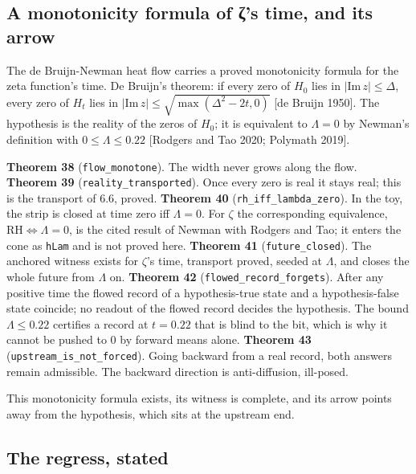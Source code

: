 \documentclass[10pt,twocolumn]{article}
\begin{document}
\hypertarget{a-monotonicity-formula-of-ux3b6s-time-and-its-arrow}{%
\subsection{A monotonicity formula of ζ's time, and its
arrow}\label{a-monotonicity-formula-of-ux3b6s-time-and-its-arrow}}

The de Bruijn-Newman heat flow carries a proved monotonicity formula for
the zeta function's time. De Bruijn's theorem: if every zero of \(H_0\)
lies in \(|\mathrm{Im}\, z| \leq \Delta\), every zero of \(H_t\) lies in
\(|\mathrm{Im}\, z| \leq \sqrt{\max(\Delta^2 - 2t, 0)}\) {[}de Bruijn
1950{]}. The hypothesis is the reality of the zeros of \(H_0\); it is
equivalent to \(\Lambda = 0\) by Newman's definition with
\(0 \leq \Lambda \leq 0.22\) {[}Rodgers and Tao 2020; Polymath 2019{]}.

\textbf{Theorem 38} (\texttt{flow\_monotone}). The width never grows
along the flow. \textbf{Theorem 39} (\texttt{reality\_transported}).
Once every zero is real it stays real; this is the transport of 6.6,
proved. \textbf{Theorem 40} (\texttt{rh\_iff\_lambda\_zero}). In the
toy, the strip is closed at time zero iff \(\Lambda = 0\). For \(\zeta\)
the corresponding equivalence, \(\mathrm{RH} \iff \Lambda = 0\), is the
cited result of Newman with Rodgers and Tao; it enters the cone as
\texttt{hLam} and is not proved here. \textbf{Theorem 41}
(\texttt{future\_closed}). The anchored witness exists for \(\zeta\)'s
time, transport proved, seeded at \(\Lambda\), and closes the whole
future from \(\Lambda\) on. \textbf{Theorem 42}
(\texttt{flowed\_record\_forgets}). After any positive time the flowed
record of a hypothesis-true state and a hypothesis-false state coincide;
no readout of the flowed record decides the hypothesis. The bound
\(\Lambda \leq 0.22\) certifies a record at \(t = 0.22\) that is blind
to the bit, which is why it cannot be pushed to \(0\) by forward means
alone. \textbf{Theorem 43} (\texttt{upstream\_is\_not\_forced}). Going
backward from a real record, both answers remain admissible. The
backward direction is anti-diffusion, ill-posed.

This monotonicity formula exists, its witness is complete, and its arrow
points away from the hypothesis, which sits at the upstream end.

\hypertarget{the-regress-stated}{%
\subsection{The regress, stated}\label{the-regress-stated}}
\end{document}
